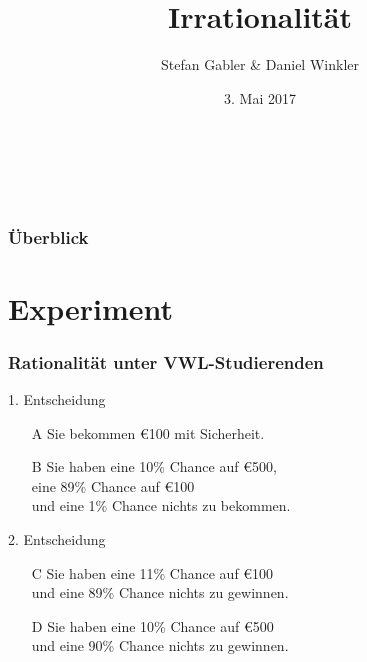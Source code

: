 \documentclass{beamer}
\title{Irrationalit\"at}
\author{Stefan Gabler \& Daniel Winkler}
\date{3. Mai 2017}
\begin{document}
\begin{frame}[plain]
  \titlepage
  \begin{center}
    

  \textcite{oliver2003quantitative}\\\\
  \end{center}
\end{frame}

\begin{frame}
  \frametitle{\"Uberblick}
  \tableofcontents
\end{frame}

\section{Experiment}
\label{sec:experiment}

\begin{frame}  
 \frametitle{Rationalit\"at unter VWL-Studierenden}
  
    
      
  \begin{block}{1. Entscheidung}
   \begin{itemize}
      \item[A] Sie bekommen \euro 100  mit Sicherheit.
      \item[B] Sie haben eine 10\% Chance auf \euro  500,\\ eine 89\% Chance auf \euro 100\\ und eine 1\% Chance nichts zu bekommen.
     \end{itemize}

   \end{block}



    \begin{block}{2. Entscheidung}
      \begin{itemize}
      \item[C] Sie haben eine 11\% Chance auf \euro 100\\und eine 89\% Chance nichts zu gewinnen.
      \item[D] Sie haben eine 10\% Chance auf \euro 500\\und eine 90\% Chance nichts zu gewinnen.
      \end{itemize}
   \end{block}

  
  
 \end{frame}
\end{document}

